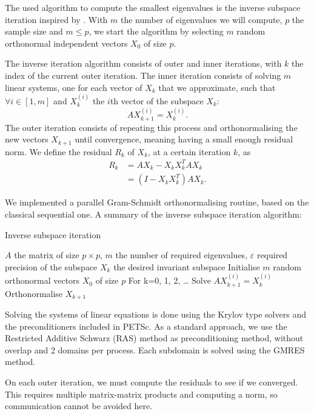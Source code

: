 The used algorithm to compute the smallest eigenvalues is the inverse subspace iteration inspired by \cite{el_khoury_acceleration_2014}.
With \(m\) the number of eigenvalues we will compute, \(p\) the sample size and \(m \le p\), we start the algorithm by selecting \(m\) random orthonormal independent vectors \(X_0\) of size \(p\).

The inverse iteration algorithm consists of outer and inner iterations, with \(k\) the index of the current outer iteration.
The inner iteration consists of solving \(m\) linear systems, one for each vector of \(X_k\) that we approximate, such that \(\forall i \in [1, m]\) and \(X_k^{(i)}\) the \(i\)th vector of the subspace \(X_k\):
\[A X_{k+1}^{(i)} = X_k^{(i)}.\]
The outer iteration consists of repeating this process and orthonormalising the new vectors \(X_{k+1}\) until convergence, meaning having a small enough residual norm.
We define the residual \(R_k\) of \(X_k\), at a certain iteration \(k\), as
\begin{equation}
 \begin{split}
  R_k & = A X_k - X_k X_k^T A X_k \\
      & = (I - X_k X_k^T) A X_k.
 \end{split}
\end{equation}

We implemented a parallel Gram-Schmidt orthonormalising routine, based on the classical sequential one.
A summary of the inverse subspace iteration algorithm:

\begin{algorithm}[H]
 \caption{Inverse subspace iteration}
 \begin{algorithmic}
  \REQUIRE \(A\) the matrix of size \(p \times p\), \(m\) the number of required eigenvalues, \(\varepsilon\) required precision of the subspace
  \ENSURE \(X_k\) the desired invariant subspace
  \STATE Initialise \(m\) random orthonormal vectors \(X_0\) of size \(p\)
  \STATE For k=0, 1, 2, \dots
    \STATE Solve \(A X_{k+1}^{(i)} = X_k^{(i)}\)
   \ENDFOR
   \STATE Orthonormalise \(X_{k+1}\)
  \ENDWHILE
 \end{algorithmic}
\end{algorithm}

Solving the systems of linear equations is done using the Krylov type solvers and the preconditioners included in PETSc.
As a standard approach, we use the Restricted Additive Schwarz (RAS) method as preconditioning method, without overlap and 2 domains per process.
Each subdomain is solved using the GMRES method.

On each outer iteration, we must compute the residuals to see if we converged.
This requires multiple matrix-matrix products and computing a norm, so communication cannot be avoided here.
